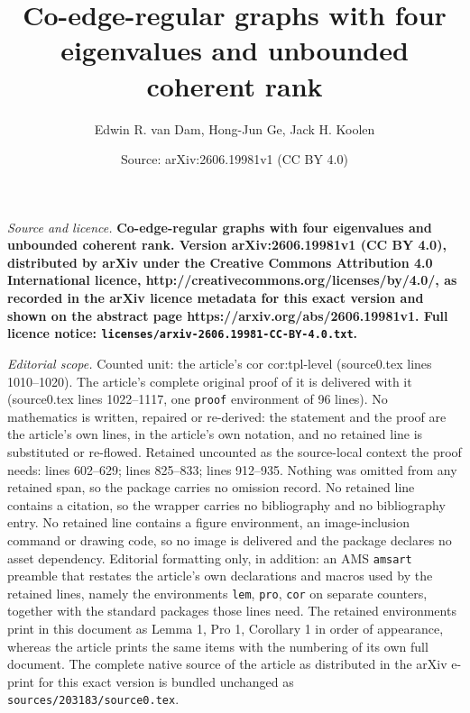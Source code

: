 \documentclass[10pt,a4paper]{amsart}
\title{\bf Co-edge-regular graphs with four eigenvalues and unbounded coherent rank}
\author{Edwin R. van Dam, Hong-Jun Ge, Jack H. Koolen}
\date{Source: arXiv:2606.19981v1 (CC BY 4.0)}
\begin{document}
\maketitle

\noindent\emph{Source and licence.} \bf Co-edge-regular graphs with four eigenvalues and unbounded coherent rank. Version arXiv:2606.19981v1 (CC BY 4.0), distributed by arXiv under the Creative Commons Attribution 4.0 International licence, http://creativecommons.org/licenses/by/4.0/, as recorded in the arXiv licence metadata for this exact version and shown on the abstract page https://arxiv.org/abs/2606.19981v1. Full licence notice: \texttt{licenses/arxiv-2606.19981-CC-BY-4.0.txt}.\par\smallskip

\noindent\textit{Editorial scope.} Counted unit: the article's cor cor:tpl-level (source0.tex lines 1010--1020). The article's complete original proof of it is delivered with it (source0.tex lines 1022--1117, one \texttt{proof} environment of 96 lines). No mathematics is written, repaired or re-derived: the statement and the proof are the article's own lines, in the article's own notation, and no retained line is substituted or re-flowed.  Retained uncounted as the source-local context the proof needs: lines 602--629; lines 825--833; lines 912--935.  Nothing was omitted from any retained span, so the package carries no omission record.  No retained line contains a citation, so the wrapper carries no bibliography and no bibliography entry.  No retained line contains a figure environment, an image-inclusion command or drawing code, so no image is delivered and the package declares no asset dependency.  Editorial formatting only, in addition: an AMS \texttt{amsart} preamble that restates the article's own declarations and macros used by the retained lines, namely the environments \texttt{lem}, \texttt{pro}, \texttt{cor} on separate counters, together with the standard packages those lines need.  The retained environments print in this document as Lemma 1, Pro 1, Corollary 1 in order of appearance, whereas the article prints the same items with the numbering of its own full document.  The complete native source of the article as distributed in the arXiv e-print for this exact version is bundled unchanged as \texttt{sources/203183/source0.tex}.
\end{document}
